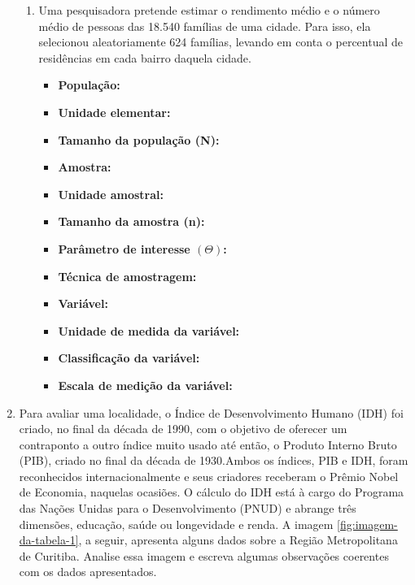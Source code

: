 \begin{enumerate}[label=\emph{\arabic*})]
\begin{enumerate}[label=\emph{\alph*})]
		      \item Uma pesquisadora pretende estimar o rendimento médio e o número médio de pessoas
		            das 18.540 famílias de uma cidade. Para isso, ela selecionou aleatoriamente 624
		            famílias, levando em conta o percentual de residências em cada bairro daquela cidade.

		            \begin{itemize}
			            \item \textbf{População:}~

			            \item \textbf{Unidade elementar:}~

			            \item \textbf{Tamanho da população (N):}~

			            \item \textbf{Amostra:}~

			            \item \textbf{Unidade amostral:}~

			            \item \textbf{Tamanho da amostra (n):}~

			            \item \textbf{Parâmetro de interesse $\left(\varTheta\right)$:}~

			            \item \textbf{Técnica de amostragem:}~

			            \item \textbf{Variável:}~

			            \item \textbf{Unidade de medida da variável:}~

			            \item \textbf{Classificação da variável:}~

			            \item \textbf{Escala de medição da variável:}~
		            \end{itemize}

	      \end{enumerate}

	\item Para avaliar uma localidade, o Índice de Desenvolvimento Humano (IDH) foi criado, no final da década de 1990, com o objetivo de oferecer um contraponto a outro índice muito usado até então, o Produto Interno Bruto (PIB), criado no final da década de 1930.Ambos os índices, PIB e IDH, foram reconhecidos internacionalmente e seus criadores receberam o Prêmio Nobel de Economia, naquelas ocasiões. O cálculo do IDH está à cargo do Programa das Nações Unidas para o Desenvolvimento (PNUD) e abrange três dimensões, educação, saúde ou longevidade e renda. A imagem \ref{fig:imagem-da-tabela-1}, a seguir, apresenta alguns dados sobre a Região Metropolitana de Curitiba. Analise essa imagem e escreva algumas observações coerentes com os dados apresentados.


\end{enumerate}
